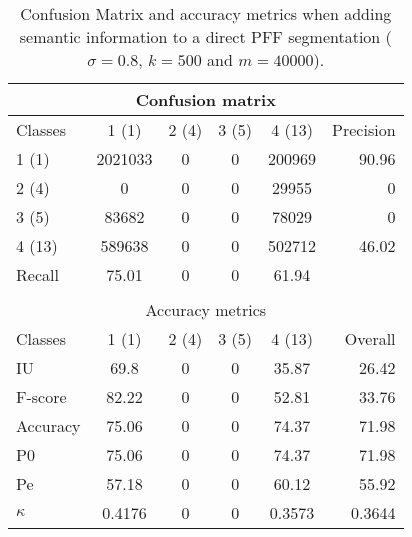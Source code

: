 \begin{table}[htbp]
\begin{center}
\begin{tabular}{|l|c|c|c|c|r|}
\hline
\multicolumn{6}{|c|}{Confusion matrix} \\
\hline
 Classes & 1 (1) & 2 (4) & 3 (5) & 4 (13) & Precision \\
\hline
1 (1) & 2021033 & 0 & 0 & 200969 & 90.96 \\
\hline
2 (4) & 0 & 0 & 0 & 29955 & 0 \\
\hline
3 (5) & 83682 & 0 & 0 & 78029 & 0 \\
\hline
4 (13) & 589638 & 0 & 0 & 502712 & 46.02 \\
\hline
Recall & 75.01 & 0 & 0 & 61.94 &  \\
\hline
\multicolumn{6}{c}{ } \\
\hline
\multicolumn{6}{|c|}{Accuracy metrics} \\
\hline
 Classes & 1 (1) & 2 (4) & 3 (5) & 4 (13) & Overall \\
\hline
IU & 69.8 & 0 & 0 & 35.87 & 26.42 \\
\hline
F-score & 82.22 & 0 & 0 & 52.81 & 33.76 \\
\hline
Accuracy & 75.06 & 0 & 0 & 74.37 & 71.98 \\
\hline
P0 & 75.06 & 0 & 0 & 74.37 & 71.98 \\
\hline
Pe & 57.18 & 0 & 0 & 60.12 & 55.92 \\
\hline
$\kappa$ & 0.4176 & 0 & 0 & 0.3573 & 0.3644 \\
\hline
\end{tabular}
\caption{Confusion Matrix and accuracy metrics when adding semantic information to a direct PFF segmentation ($\sigma=0.8$, $k=500$ and $m=40000$).}
\label{table:C3_S2_seg_PFF}
\end{center}
\end{table}